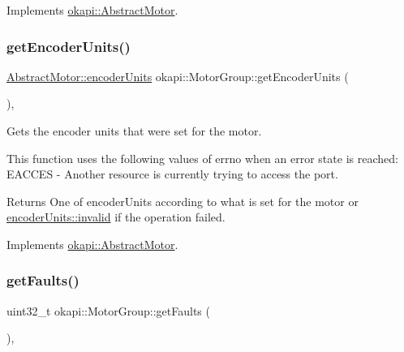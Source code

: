 Implements \mbox{\hyperlink{classokapi_1_1AbstractMotor_a87177280c20a855a74354dd8ba6e1d6a}{okapi\+::\+Abstract\+Motor}}.

\mbox{\label{classokapi_1_1MotorGroup_a1bc6347732e108a171b6e9a846722817}} 
\subsubsection{\texorpdfstring{getEncoderUnits()}{getEncoderUnits()}}
{\footnotesize\ttfamily \mbox{\hyperlink{classokapi_1_1AbstractMotor_ae811cd825099f2defadeb1b7f7e7764c}{Abstract\+Motor\+::encoder\+Units}} okapi\+::\+Motor\+Group\+::get\+Encoder\+Units (\begin{DoxyParamCaption}{ }\end{DoxyParamCaption})\hspace{0.3cm}{\ttfamily [override]}, {\ttfamily [virtual]}}

Gets the encoder units that were set for the motor.

This function uses the following values of errno when an error state is reached\+: E\+A\+C\+C\+ES -\/ Another resource is currently trying to access the port.

\begin{DoxyReturn}{Returns}
One of encoder\+Units according to what is set for the motor or \mbox{\hyperlink{classokapi_1_1AbstractMotor_ae811cd825099f2defadeb1b7f7e7764cafedb2d84cafe20862cb4399751a8a7e3}{encoder\+Units\+::invalid}} if the operation failed. 
\end{DoxyReturn}


Implements \mbox{\hyperlink{classokapi_1_1AbstractMotor_ae8225381a81ca0b54469949a6022b775}{okapi\+::\+Abstract\+Motor}}.

\mbox{\label{classokapi_1_1MotorGroup_a1fece81a588e0d2ab40a08a1bcb86475}} 
\subsubsection{\texorpdfstring{getFaults()}{getFaults()}}
{\footnotesize\ttfamily uint32\+\_\+t okapi\+::\+Motor\+Group\+::get\+Faults (\begin{DoxyParamCaption}{ }\end{DoxyParamCaption})\hspace{0.3cm}{\ttfamily [override]}, {\ttfamily [virtual]}}


